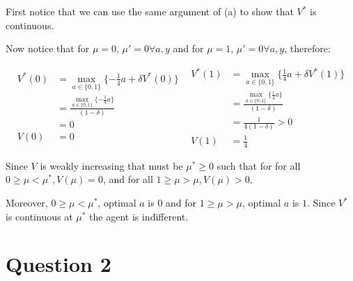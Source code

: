 \documentclass{article}
\begin{document}
First notice that we can use the same argument of (a) to show that $V^*$ is continuous.

Now notice that for $\mu = 0$, $\mu' = 0 \forall a,y$ and for $\mu = 1$,
$\mu' = 0 \forall a,y$, therefore:

\[
  \begin{split}
    V^*(0) & =  \max_{a \in \{0, 1\}}\{- \frac{1}{4}a + \delta V^*(0) \} \\
           & = \frac{\max_{a \in \{0, 1\}}\{- \frac{1}{4}a\}}{(1 - \delta)} \\
           & = 0 \\
    V(0)   & = 0
  \end{split}
  \ \    
  \begin{split}
    V^*(1) & =  \max_{a \in \{0, 1\}}\{\frac{1}{4}a + \delta V^*(1) \} \\
           & = \frac{\max_{a \in \{0, 1\}}\{\frac{1}{4}a\}}{(1 - \delta)} \\
           & = \frac{1}{4(1 - \delta)} > 0 \\
    V(1)   & = \frac{1}{4}
  \end{split}
\]

Since $V$ is weakly increasing that must be $\mu^* \ge 0$ such that for for all 
$0 \ge \mu < \mu^*, V(\mu) = 0$, and for all $1 \ge \mu > \mu, V(\mu) > 0$.

Moreover, $0 \ge \mu < \mu^*$, optimal $a$ is $0$ and for $1 \ge \mu > \mu$, 
optimal $a$ is $1$. Since $V^*$ is continuous at $\mu^*$ the agent is indifferent.

\section{Question 2}
\label{sec:Question 2}
\end{document}
